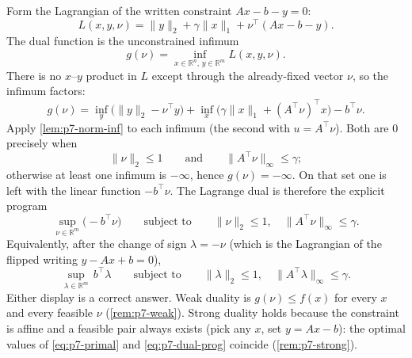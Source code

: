 Form the Lagrangian of the written constraint \(Ax-b-y=0\):
\begin{equation}
\label{eq:p7-L}
L(x,y,\nu)
=
\|y\|_{2}+\gamma\|x\|_{1}+\nu^{\top}(Ax-b-y).
\end{equation}
The dual function is the unconstrained infimum
\[
g(\nu)
=
\inf_{x\in\mathbb{R}^{n},\,y\in\mathbb{R}^{m}}L(x,y,\nu).
\]
There is no \(x\)--\(y\) product in \(L\) except through the already-fixed vector \(\nu\), so the infimum factors:
\begin{equation}
\label{eq:p7-g-split}
g(\nu)
=
\inf_{y}\bigl(\|y\|_{2}-\nu^{\top}y\bigr)
+
\inf_{x}\bigl(\gamma\|x\|_{1}+(A^{\top}\nu)^{\top}x\bigr)
-
b^{\top}\nu.
\end{equation}
Apply \cref{lem:p7-norm-inf} to each infimum (the second with \(u=A^{\top}\nu\)). Both are \(0\) precisely when
\[
\|\nu\|_{2}\le 1
\qquad\text{and}\qquad
\|A^{\top}\nu\|_{\infty}\le\gamma;
\]
otherwise at least one infimum is \(-\infty\), hence \(g(\nu)=-\infty\). On that set one is left with the linear function \(-b^{\top}\nu\). The Lagrange dual is therefore the explicit program
\begin{equation}
\label{eq:p7-dual-prog}
\sup_{\nu\in\mathbb{R}^{m}}\bigl(-b^{\top}\nu\bigr)
\qquad\text{subject to}\qquad
\|\nu\|_{2}\le 1,
\quad
\|A^{\top}\nu\|_{\infty}\le\gamma.
\end{equation}
Equivalently, after the change of sign \(\lambda=-\nu\) (which is the Lagrangian of the flipped writing \(y-Ax+b=0\)),
\begin{equation}
\label{eq:p7-dual-flip}
\sup_{\lambda\in\mathbb{R}^{m}}\,b^{\top}\lambda
\qquad\text{subject to}\qquad
\|\lambda\|_{2}\le 1,
\quad
\|A^{\top}\lambda\|_{\infty}\le\gamma.
\end{equation}
Either display is a correct answer. Weak duality is \(g(\nu)\le f(x)\) for every \(x\) and every feasible \(\nu\) (\cref{rem:p7-weak}). Strong duality holds because the constraint is affine and a feasible pair always exists (pick any \(x\), set \(y=Ax-b\)): the optimal values of \eqref{eq:p7-primal} and \eqref{eq:p7-dual-prog} coincide (\cref{rem:p7-strong}).

